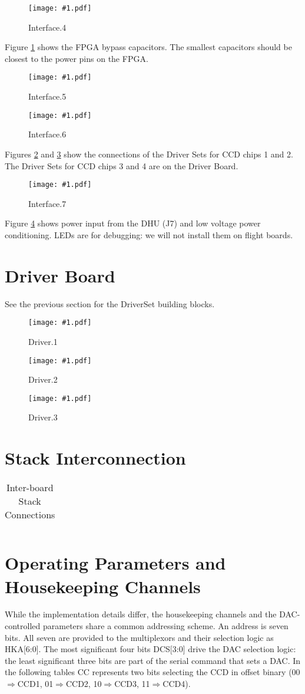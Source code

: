 \documentclass[12pt]{article}
\let\oldsection\section
\renewcommand{\section}{\FloatBarrier\oldsection}
\newcommand{\schempage}[1]{
   \begin{figure}[ht!]
   \centerline{\texttt{[image: \#1.pdf]}}
    \caption{#1}
    \label{#1}
    \end{figure}
}
\begin{document}
\schempage{Interface.4}
Figure \ref{Interface.4} shows the FPGA bypass capacitors. The smallest capacitors should be closest to the power pins on the FPGA.

\schempage{Interface.5}
\schempage{Interface.6}
Figures \ref{Interface.5} and \ref{Interface.6} show the connections of the Driver Sets for CCD chips 1 and 2. The Driver Sets for CCD chips 3 and 4 are on the Driver Board.
\FloatBarrier
\schempage{Interface.7}
\FloatBarrier
Figure \ref{Interface.7} shows power input from the DHU (J7) and low voltage power conditioning. LEDs are for debugging: we will not install them on flight boards.

\section{Driver Board}
\label{Driver}
See the previous section for the DriverSet building blocks.
\schempage{Driver.1}
\schempage{Driver.2}
\schempage{Driver.3}

\section{Stack Interconnection}

\tiny{
    \begin{longtable}{|m{}|m{}|m{}|m{}|m{}|m{}|m{}|m{}|@{}m{0pt}@{}}
    \caption{Inter-board Stack Connections} \label{Stack} \\
    \hline
    
    \end{longtable}
}

\normalsize

\section{Operating Parameters and Housekeeping Channels}
\label{param}

While the implementation details differ, the housekeeping channels and the DAC-controlled parameters share a common addressing scheme. An address is seven bits. All seven are provided to the multiplexors and their selection logic as HKA[6:0]. The most significant four bits DCS[3:0] drive the DAC selection logic: the least significant three bits are part of the serial command that sets a DAC. In the following tables CC represents two bits selecting the CCD in offset binary (00$\Rightarrow$CCD1, 01$\Rightarrow$CCD2, 10$\Rightarrow$CCD3, 11$\Rightarrow$CCD4).
\end{document}
